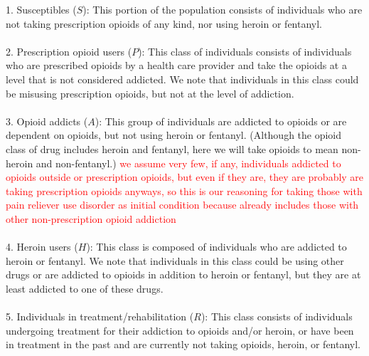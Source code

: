 \documentclass[12pt]{article}
\begin{document}
1. Susceptibles ($S$): This portion of the population consists of individuals who are not taking prescription opioids of any kind, nor using heroin or fentanyl. \\ \\
2. Prescription opioid users ($P$): This class of individuals consists of individuals who are prescribed opioids by a health care provider and take the opioids at a level that is not considered addicted. We note that individuals in this class could be misusing prescription opioids, but not at the level of addiction.  \\ \\
3. Opioid addicts ($A$): This group of individuals are addicted to opioids or are dependent on opioids, but not using heroin or fentanyl. (Although the opioid class of drug includes heroin and fentanyl, here we will take opioids to mean non-heroin and non-fentanyl.) \textcolor{red}{we assume very few, if any, individuals addicted to opioids outside or prescription opioids, but even if they are, they are probably are taking prescription opioids anyways, so this is our reasoning for taking those with pain reliever use disorder as initial condition because already includes those with other non-prescription opioid addiction} \\ \\
4. Heroin users ($H$): This class is composed of individuals who are addicted to heroin or fentanyl. We note that individuals in this class could be using other drugs or are addicted to opioids in addition to heroin or fentanyl, but they are at least addicted to one of these drugs. \\ \\
5. Individuals in treatment/rehabilitation ($R$): This class consists of individuals undergoing treatment for their addiction to opioids and/or heroin, or have been in treatment in the past and are currently not taking opioids, heroin, or fentanyl.

\end{document}
